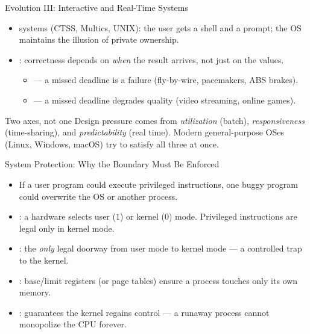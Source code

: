 \documentclass[aspectratio=169]{beamer}
\begin{document}
\begin{frame}{Evolution III: Interactive and Real-Time Systems}
  \begin{itemize}
    \item {} systems (CTSS, Multics, UNIX):
      the user gets a shell and a prompt; the OS maintains the illusion of
      private ownership.
    \item {}: correctness depends on \emph{when} the result
      arrives, not just on the values.
      \begin{itemize}
        \item {} --- a missed deadline is a failure
          (fly-by-wire, pacemakers, ABS brakes).
        \item {} --- a missed deadline degrades quality
          (video streaming, online games).
      \end{itemize}
  \end{itemize}
  \vspace{0.2cm}
  \begin{alertblock}{Two axes, not one}
    Design pressure comes from \emph{utilization} (batch), \emph{responsiveness}
    (time-sharing), and \emph{predictability} (real time). Modern general-purpose
    OSes (Linux, Windows, macOS) try to satisfy all three at once.
  \end{alertblock}
\end{frame}

\begin{frame}{System Protection: Why the Boundary Must Be Enforced}
  \begin{itemize}
    \item If a user program could execute privileged instructions, one buggy
      program could overwrite the OS or another process.
    \item {}: a hardware  selects user
      ($1$) or kernel ($0$) mode. Privileged instructions are legal only in
      kernel mode.
    \item {}: the \emph{only} legal doorway from user mode to
      kernel mode --- a controlled trap to the kernel.
    \item {}: base/limit registers (or page tables) ensure
      a process touches only its own memory.
    \item {}: guarantees the kernel regains control --- a
      runaway process cannot monopolize the CPU forever.
  \end{itemize}
  \vspace{0.2cm}
\end{frame}
\end{document}
